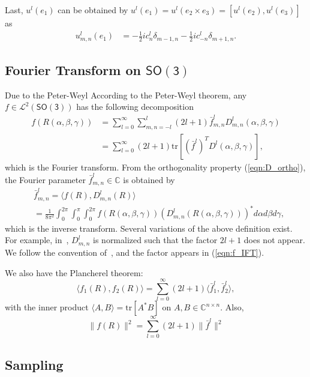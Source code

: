 \documentclass{ieeetran}
\newcommand{\pair}[1]{\ensuremath{\langle #1 \rangle}}
\newcommand{\refeqn}[1]{(\ref{eqn:#1})}
\newcommand{\trs}[1]{\mathrm{tr}\ensuremath{[#1]}}
\newcommand{\SO}{\ensuremath{\mathsf{SO(3)}}}
\newcommand{\Cp}{\ensuremath{\mathbb{C}}}
\begin{document}
Last, $u^l(e_1)$ can be obtained by $u^l(e_1)=u^l(e_2\times e_3)=[u^l(e_2), u^l(e_3)]$ as
\begin{align}
u^l_{m,n}(e_1) 
& = -\frac{1}{2}i c^l_n \delta_{m-1,n}-\frac{1}{2}i c^l_{-n} \delta_{m+1,n}.
\end{align}

\subsection{Fourier Transform on $\SO$}

Due to the Peter-Weyl
According to the Peter-Weyl theorem, any $f\in\mathcal{L}^2(\SO)$ has the following decomposition
\begin{align}
f(R(\alpha,\beta,\gamma)) &= \sum_{l=0}^\infty \sum_{m,n=-l}^l (2l+1)\bar f^l_{m,n} D^l_{m,n}(\alpha,\beta,\gamma)\nonumber\\
&= \sum_{l=0}^\infty (2l+1)\trs{(\bar f^l)^T D^l(\alpha,\beta,\gamma)},\label{eqn:f_IFT}
\end{align}
which is the Fourier transform. From the orthogonality property \refeqn{D_ortho}, the Fourier parameter $\bar f^l_{m,n}\in\Cp$ is obtained by
\begin{align}
& \bar f^l_{m,n}=\pair{ f(R), D^l_{m,n}(R)}\nonumber\\
& =\frac{1}{8\pi^2}\int_0^{2\pi}\int_{0}^\pi\int_0^{2\pi} f(R(\alpha,\beta,\gamma)) (D^{l}_{m,n}(R(\alpha,\beta,\gamma)))^*d\alpha d\beta d\gamma,\label{eqn:f_FT}
\end{align}
which is the inverse transform. Several variations of the above definition exist. For example, in~\cite{KosRocJFAA08}, $D^l_{m,n}$ is normalized such that the factor $2l+1$ does not appear. We follow the convention of~\cite{ChiKya01}, and the factor appears in \refeqn{f_IFT}.

We also have the Plancherel theorem:
\[
\pair{f_1(R), f_2(R)} = \sum_{l=0}^\infty (2l+1)\pair{\bar f_1^l, \bar f_2^l},
\]
with the inner product $\pair{A,B}=\trs{A^*B}$ on $A,B\in\Cp^{n\times n}$. Also, 
\[
\| f(R)\|^2 = \sum_{l=0}^\infty (2l+1)\|\bar f^l\|^2
\]


\subsection{Sampling}
\end{document}
